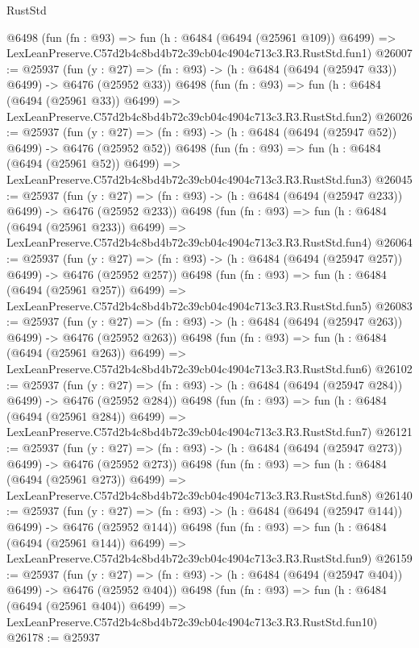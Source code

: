 \begin{lexlean}{RustStd}
\begin{coremodule}
    @6498
    (fun (fn : @93) =>
    fun (h : @6484 (@6494 (@25961 @109)) @6499) =>
    LexLeanPreserve.C57d2b4c8bd4b72c39cb04c4904c713c3.R3.RustStd.fun1)
@26007 := @25937
    (fun (y : @27) => (fn : @93) -> (h : @6484 (@6494 (@25947 @33)) @6499) -> @6476 (@25952 @33))
    @6498
    (fun (fn : @93) =>
    fun (h : @6484 (@6494 (@25961 @33)) @6499) =>
    LexLeanPreserve.C57d2b4c8bd4b72c39cb04c4904c713c3.R3.RustStd.fun2)
@26026 := @25937
    (fun (y : @27) => (fn : @93) -> (h : @6484 (@6494 (@25947 @52)) @6499) -> @6476 (@25952 @52))
    @6498
    (fun (fn : @93) =>
    fun (h : @6484 (@6494 (@25961 @52)) @6499) =>
    LexLeanPreserve.C57d2b4c8bd4b72c39cb04c4904c713c3.R3.RustStd.fun3)
@26045 := @25937
    (fun (y : @27) => (fn : @93) -> (h : @6484 (@6494 (@25947 @233)) @6499) -> @6476 (@25952 @233))
    @6498
    (fun (fn : @93) =>
    fun (h : @6484 (@6494 (@25961 @233)) @6499) =>
    LexLeanPreserve.C57d2b4c8bd4b72c39cb04c4904c713c3.R3.RustStd.fun4)
@26064 := @25937
    (fun (y : @27) => (fn : @93) -> (h : @6484 (@6494 (@25947 @257)) @6499) -> @6476 (@25952 @257))
    @6498
    (fun (fn : @93) =>
    fun (h : @6484 (@6494 (@25961 @257)) @6499) =>
    LexLeanPreserve.C57d2b4c8bd4b72c39cb04c4904c713c3.R3.RustStd.fun5)
@26083 := @25937
    (fun (y : @27) => (fn : @93) -> (h : @6484 (@6494 (@25947 @263)) @6499) -> @6476 (@25952 @263))
    @6498
    (fun (fn : @93) =>
    fun (h : @6484 (@6494 (@25961 @263)) @6499) =>
    LexLeanPreserve.C57d2b4c8bd4b72c39cb04c4904c713c3.R3.RustStd.fun6)
@26102 := @25937
    (fun (y : @27) => (fn : @93) -> (h : @6484 (@6494 (@25947 @284)) @6499) -> @6476 (@25952 @284))
    @6498
    (fun (fn : @93) =>
    fun (h : @6484 (@6494 (@25961 @284)) @6499) =>
    LexLeanPreserve.C57d2b4c8bd4b72c39cb04c4904c713c3.R3.RustStd.fun7)
@26121 := @25937
    (fun (y : @27) => (fn : @93) -> (h : @6484 (@6494 (@25947 @273)) @6499) -> @6476 (@25952 @273))
    @6498
    (fun (fn : @93) =>
    fun (h : @6484 (@6494 (@25961 @273)) @6499) =>
    LexLeanPreserve.C57d2b4c8bd4b72c39cb04c4904c713c3.R3.RustStd.fun8)
@26140 := @25937
    (fun (y : @27) => (fn : @93) -> (h : @6484 (@6494 (@25947 @144)) @6499) -> @6476 (@25952 @144))
    @6498
    (fun (fn : @93) =>
    fun (h : @6484 (@6494 (@25961 @144)) @6499) =>
    LexLeanPreserve.C57d2b4c8bd4b72c39cb04c4904c713c3.R3.RustStd.fun9)
@26159 := @25937
    (fun (y : @27) => (fn : @93) -> (h : @6484 (@6494 (@25947 @404)) @6499) -> @6476 (@25952 @404))
    @6498
    (fun (fn : @93) =>
    fun (h : @6484 (@6494 (@25961 @404)) @6499) =>
    LexLeanPreserve.C57d2b4c8bd4b72c39cb04c4904c713c3.R3.RustStd.fun10)
@26178 := @25937

\end{coremodule}
\end{lexlean}
